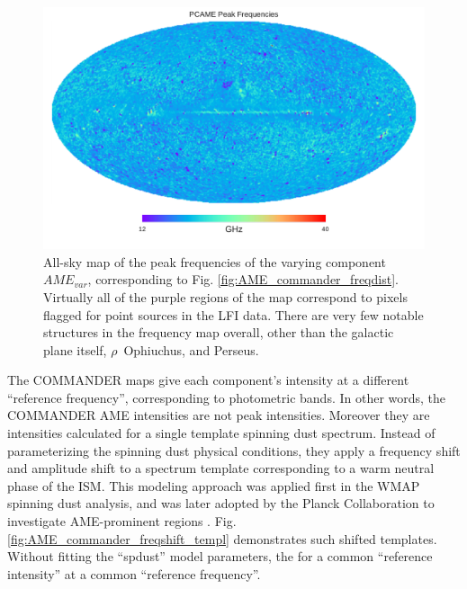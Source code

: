         \begin{figure}
          \includegraphics[width=\textwidth]{../Plots/ch_datasources/PCAME_var_freq.pdf}
          \centering
          \caption{All-sky map of the peak frequencies of the varying component $AME_{var}$, corresponding to Fig. \ref{fig:AME_commander_freqdist}. Virtually all of the purple regions of the map correspond to pixels flagged for point sources in the LFI data. There are very few notable structures in the frequency map overall, other than the galactic plane itself, $\rho$~Ophiuchus, and Perseus.}
          \label{fig:PCAME_var_freq}
        \end{figure}

        The COMMANDER maps give each component's intensity at a different ``reference frequency'', corresponding to photometric bands. In other words, the COMMANDER AME intensities are not peak intensities. Moreover they are intensities calculated for a single template spinning dust spectrum. Instead of parameterizing the spinning dust physical conditions, they apply a frequency shift and amplitude shift to a spectrum template corresponding to a warm neutral phase of the ISM. This modeling approach was applied first in the WMAP spinning dust analysis, and was later adopted by the Planck Collaboration to investigate AME-prominent regions \citep{planckXV}. Fig. \ref{fig:AME_commander_freqshift_templ} demonstrates such shifted templates. Without fitting the ``spdust'' model parameters, the  for a common ``reference intensity'' at a common ``reference frequency''.

